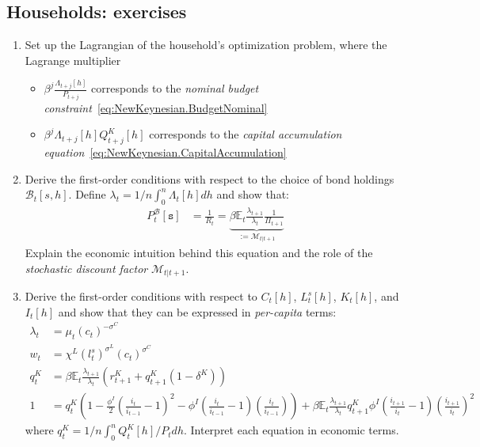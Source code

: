 \subsection{Households: exercises}
\begin{enumerate}
\item
Set up the Lagrangian of the household's optimization problem,
  where the Lagrange multiplier
  \begin{itemize}
  \item \(\beta^{j} \frac{\Lambda_{t+j}[h]}{P_{t+j}}\) corresponds to the \emph{nominal budget constraint}~\eqref{eq:NewKeynesian.BudgetNominal}
  \item \(\beta^{j} \Lambda_{t+j}[h] Q^{K}_{t+j}[h]\) corresponds to the \emph{capital accumulation equation}~\eqref{eq:NewKeynesian.CapitalAccumulation}
  \end{itemize}

\item
Derive the first-order conditions with respect to the choice of bond holdings \(\mathcal{B}_{t}[s,h]\).
Define \(\lambda_{t}=1/n \int_{0}^{n} \Lambda_{t}[h] dh\) and show that:
\begin{align}
P^{\mathcal{B}}_{t}[\mathtt{s}] &= \frac{1}{R_{t}} = \underbrace{\beta \mathbb{E}_{t} \frac{\lambda_{t+1}}{\lambda_{t}} \frac{1}{\Pi_{t+1}}}_{:= \mathcal{M}_{t|t+1}}
\label{eq:NewKeynesian.EulerBond}
\end{align}
Explain the economic intuition behind this equation and the role of the \emph{stochastic discount factor} \(\mathcal{M}_{t|t+1}\).

\item
Derive the first-order conditions with respect to \(C_{t}[h]\), \(L^{s}_{t}[h]\), \(K_{t}[h]\), and \(I_{t}[h]\)
  and show that they can be expressed in \emph{per-capita} terms:
\begin{align}
\lambda_t &= \mu_{t} {(c_{t})}^{-\sigma^{C}} \label{eq:NewKeynesian.MarginalUtility}
\\
w_{t} &= \chi^{L} {(l^{s}_{t})}^{\sigma^{L}} {(c_{t})}^{\sigma^{C}}
\label{eq:NewKeynesian.LaborSupply}
\\
q^{K}_{t} &= \beta \mathbb{E}_{t} \frac{\lambda_{t+1}}{\lambda_t} \left( r^{K}_{t+1} + q^{K}_{t+1} (1-\delta^{K}) \right)
\label{eq:NewKeynesian.EulerCapital}
\\
1 &= q^{K}_{t} \left(
  1 - \frac{\phi^{I}}{2} {\left(\frac{i_{t}}{i_{t-1}}-1\right)}^2
  - \phi^{I} \left(\frac{i_{t}}{i_{t-1}}-1\right) \left(\frac{i_{t}}{i_{t-1}}\right)
  \right)
  + \beta \mathbb{E}_{t} \frac{\lambda_{t+1}}{\lambda_t} q^{K}_{t+1} \phi^{I} \left(\frac{i_{t+1}}{i_{t}}-1\right) {\left(\frac{i_{t+1}}{i_{t}}\right)}^2
\label{eq:NewKeynesian.EulerInvestment}
\end{align}
where \(q^{K}_{t} = 1/n \int_{0}^{n} Q^{K}_{t}[h]/P_{t} dh\).
Interpret each equation in economic terms.


\end{enumerate}
